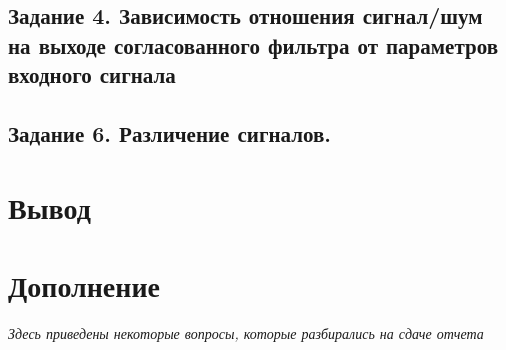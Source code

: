 \subsection{Задание 4. Зависимость отношения сигнал/шум на выходе согласованного
фильтра от параметров входного сигнала}



\subsection{Задание 6. Различение сигналов.}

\section{Вывод}


\newpage
\section{Дополнение}
\textit{Здесь приведены некоторые вопросы, которые разбирались на сдаче отчета}

